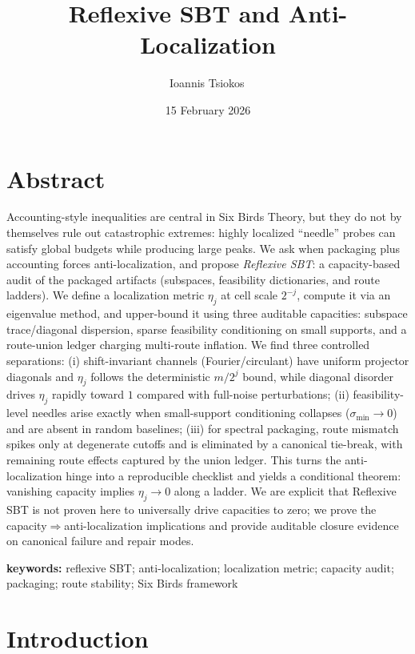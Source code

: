 \documentclass[11pt]{article}
\title{Reflexive SBT and Anti-Localization}
\author{Ioannis Tsiokos\,\orcidlink{0009-0009-7659-5964}}
\date{15 February 2026}
\theoremstyle{plain}
\theoremstyle{definition}
\theoremstyle{remark}
\newcommand{\printaffiliation}{\begin{center}\small \end{center}}
\begin{document}
\maketitle
\thispagestyle{firstpage}
\printaffiliation



\section*{Abstract}\label{sec:abstract}

\noindent
Accounting-style inequalities are central in Six Birds Theory, but they do not by themselves rule out catastrophic extremes: highly localized ``needle'' probes can satisfy global budgets while producing large peaks. We ask when packaging plus accounting forces anti-localization, and propose \emph{Reflexive SBT}: a capacity-based audit of the packaged artifacts (subspaces, feasibility dictionaries, and route ladders). We define a localization metric \(\eta_j\) at cell scale \(2^{-j}\), compute it via an eigenvalue method, and upper-bound it using three auditable capacities: subspace trace/diagonal dispersion, sparse feasibility conditioning on small supports, and a route-union ledger charging multi-route inflation. We find three controlled separations: (i) shift-invariant channels (Fourier/circulant) have uniform projector diagonals and \(\eta_j\) follows the deterministic \(m/2^j\) bound, while diagonal disorder drives \(\eta_j\) rapidly toward \(1\) compared with full-noise perturbations; (ii) feasibility-level needles arise exactly when small-support conditioning collapses (\(\sigma_{\min}\!\to 0\)) and are absent in random baselines; (iii) for spectral packaging, route mismatch spikes only at degenerate cutoffs and is eliminated by a canonical tie-break, with remaining route effects captured by the union ledger. This turns the anti-localization hinge into a reproducible checklist and yields a conditional theorem: vanishing capacity implies \(\eta_j\to 0\) along a ladder. We are explicit that Reflexive SBT is not proven here to universally drive capacities to zero; we prove the capacity\(\Rightarrow\)anti-localization implications and provide auditable closure evidence on canonical failure and repair modes.

\noindent\textbf{keywords:} reflexive SBT; anti-localization; localization metric; capacity audit; packaging; route stability; Six Birds framework
 \section{Introduction}\label{sec:introduction}
\end{document}
